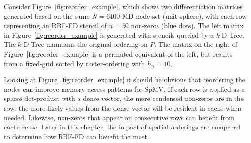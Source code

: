 \documentclass{report}
\begin{document}
Consider Figure~\ref{fig:reorder_example}, which shows two differentiation matrices generated based on the same $N=6400$ MD-node set (unit sphere), with each row representing an RBF-FD stencil of $n=50$ non-zeros (blue dots). The left matrix in Figure~\ref{fig:reorder_example} is generated with stencils queried by a $k$-D Tree. The $k$-D Tree maintains the original ordering on $P$. The matrix on the right of Figure~\ref{fig:reorder_example} is a permuted equivalent of the left, but results from a fixed-grid sorted by raster-ordering with $h_n = 10$. 

Looking at Figure~\ref{fig:reorder_example} it should be obvious that reordering the nodes can improve memory access patterns for SpMV. If each row is applied as a sparse dot-product with a dense vector, the more condensed non-zeros are in the row, the more likely values from the dense vector will be resident in cache when needed. Likewise, non-zeros that appear on consecutive rows can benefit from cache reuse. Later in this chapter, the impact of spatial orderings are compared to determine how RBF-FD can benefit the most. 
\end{document}
